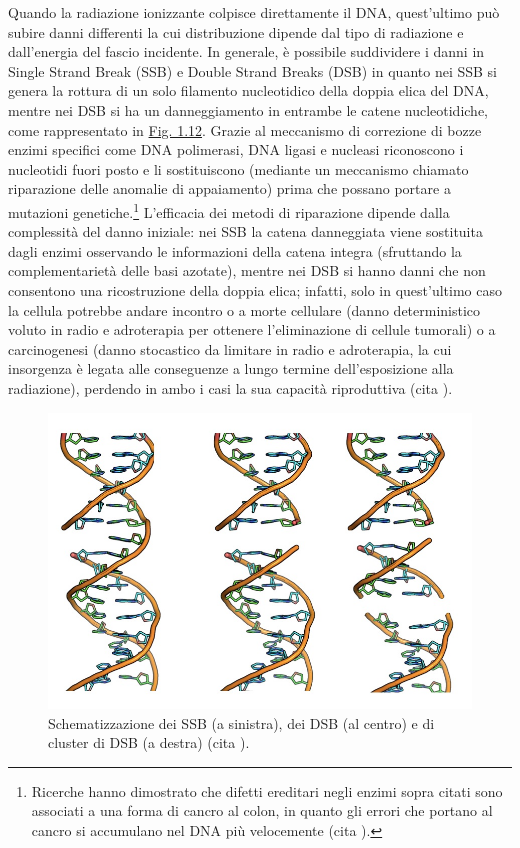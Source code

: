 \documentclass[12pt,a4paper,twoside]{report}
\begin{document}
	Quando la radiazione ionizzante colpisce direttamente il DNA, quest'ultimo può subire danni differenti la cui distribuzione dipende dal tipo di radiazione e dall'energia del fascio incidente. In generale, è possibile suddividere i danni in Single Strand Break (SSB) e Double Strand Breaks (DSB) in quanto nei SSB si genera la rottura di un solo filamento nucleotidico della doppia elica del DNA, mentre nei DSB si ha un danneggiamento in entrambe le catene nucleotidiche, come rappresentato in \hyperref[fig:danni_dna]{Fig. 1.12}. Grazie al meccanismo di correzione di bozze enzimi specifici come DNA polimerasi, DNA ligasi e nucleasi riconoscono i nucleotidi fuori posto e li sostituiscono (mediante un meccanismo chiamato riparazione delle anomalie di appaiamento) prima che possano portare a mutazioni genetiche.\footnote{Ricerche hanno dimostrato che difetti ereditari negli enzimi sopra citati sono associati a una forma di cancro al colon, in quanto gli errori che portano al cancro si accumulano nel DNA più velocemente (cita
	).} L'efficacia dei metodi di riparazione dipende dalla complessità del danno iniziale: nei SSB la catena danneggiata viene sostituita dagli enzimi osservando le informazioni della catena integra (sfruttando la complementarietà delle basi azotate), mentre nei DSB si hanno danni che non consentono una ricostruzione della doppia elica; infatti, solo in quest'ultimo caso la cellula potrebbe andare incontro o a morte cellulare (danno deterministico voluto in radio e adroterapia per ottenere l'eliminazione di cellule tumorali) o a carcinogenesi (danno stocastico da limitare in radio e adroterapia, la cui insorgenza è legata alle conseguenze a lungo termine dell'esposizione alla radiazione), perdendo in ambo i casi la sua capacità riproduttiva (cita
	).
	
	\begin{figure}[H]
		\centering
		\includegraphics[width=0.9\linewidth]{images/danni_dna.jpg}
		\caption{Schematizzazione dei SSB (a sinistra), dei DSB (al centro) e di cluster di DSB (a destra) (cita
			).}
		\label{fig:danni_dna}
	\end{figure}
	
\end{document}
